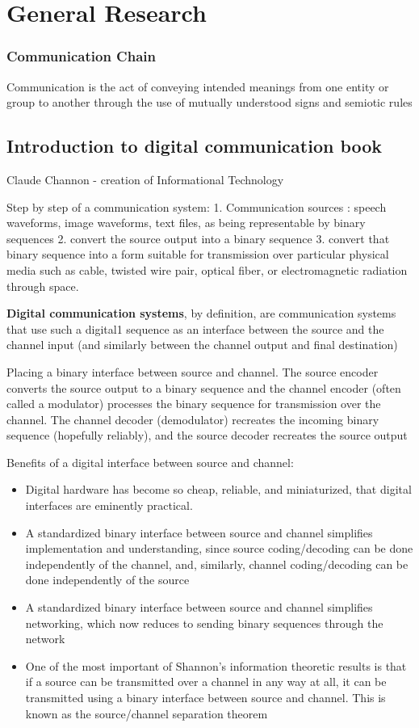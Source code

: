 \documentclass[12pt,a4paper]{report}
\begin{document}
\section{General Research}
\subsubsection{Communication Chain}


Communication is the act of conveying intended meanings from one entity or group to another through the use of mutually understood signs and semiotic rules

\subsection{Introduction to digital communication book}

Claude Channon - creation of Informational Technology

Step by step of a communication system: 
	1. Communication sources  : speech waveforms,
image waveforms, text files, as being representable by binary sequences
	2. convert the source output into a binary sequence
	3. convert that binary sequence into a form suitable for transmission over particular physical media
such as cable, twisted wire pair, optical fiber, or electromagnetic radiation through space.

	\textbf{Digital communication systems}, by definition, are communication systems that use such a digital1
sequence as an interface between the source and the channel input (and similarly between the
channel output and final destination) 

Placing a binary interface between source and channel. The source encoder converts the source output to a binary sequence and the channel encoder (often
called a modulator) processes the binary sequence for transmission over the channel.
The channel decoder (demodulator) recreates the incoming binary sequence (hopefully
reliably), and the source decoder recreates the source output

Benefits of a digital interface between source and channel:
\begin{itemize}
\item Digital hardware has become so cheap, reliable, and miniaturized, that digital interfaces are
eminently practical.
\item A standardized binary interface between source and channel simplifies implementation and
understanding, since source coding/decoding can be done independently of the channel,
and, similarly, channel coding/decoding can be done independently of the source
\item A standardized binary interface between source and channel simplifies networking, which
now reduces to sending binary sequences through the network
\item One of the most important of Shannon’s information theoretic results is that if a source
can be transmitted over a channel in any way at all, it can be transmitted using a binary
interface between source and channel. This is known as the source/channel separation
theorem
\end{itemize}
\end{document}
